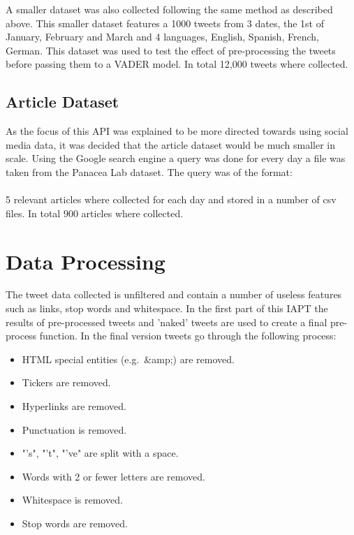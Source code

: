 A smaller dataset was also collected following the same method as described above.
This smaller dataset features a 1000 tweets from 3 dates, the 1st of January, February and March and 4 languages, English, Spanish, French, German.
This dataset was used to test the effect of pre-processing the tweets before passing them to a \ac{VADER} model.
In total 12,000 tweets where collected.

\subsection{Article Dataset}

As the focus of this \ac{API} was explained to be more directed towards using social media data, it was decided that the article dataset would be much smaller in scale.
Using the Google search engine a query was done for every day a file was taken from the Panacea Lab dataset.
The query was of the format: \\\\
5 relevant articles where collected for each day and stored in a number of csv files.
In total 900 articles where collected.

\section{Data Processing}

The tweet data collected is unfiltered and contain a number of useless features such as links, stop words and whitespace.
In the first part of this \ac{IAPT} the results of pre-processed tweets and 'naked' tweets are used to create a final pre-process function.
In the final version tweets go through the following process:

\begin{itemize}
    \item HTML special entities (e.g.\ \&amp;) are removed.
    \item Tickers are removed.
    \item Hyperlinks are removed.
    \item Punctuation is removed.
    \item "'s", "'t", "'ve" are split with a space.
    \item Words with 2 or fewer letters are removed.
    \item Whitespace is removed.
    \item Stop words are removed.
\end{itemize}

